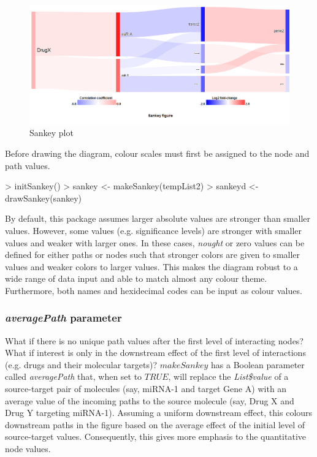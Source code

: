 \documentclass[a4paper]{article}
\begin{document}
\begin{figure}[htbp]
    \begin{center}
    \includegraphics[width=\textwidth]{figure1.png}
    \caption{Sankey plot}
    \end{center}
\end{figure}

Before drawing the diagram, colour scales  must first be assigned to the node and path values.
\begin{Schunk}
\begin{Sinput}
> initSankey()
> sankey <- makeSankey(tempList2)
> sankeyd <- drawSankey(sankey)
\end{Sinput}
\end{Schunk}

By default, this package assumes larger absolute values are stronger than smaller values. However, some values (e.g. significance levels)  are stronger with smaller values and weaker with larger ones. In these cases, \textit{nought} or zero values can be defined for either paths or nodes such that stronger colors are given to smaller values and weaker colors to larger values. This makes the diagram robust to a wide range of data input and able to match almost any colour theme. Furthermore, both names and hexidecimal codes can be input as colour values.

    \subsubsection{\textit{averagePath} parameter}
What if there is no unique path values after the first level of interacting nodes? What if interest is only in the downstream effect of the first level of interactions (e.g. drugs and their molecular targets)? $makeSankey$ has a Boolean parameter called \textit{averagePath} that, when set to $TRUE$, will replace the \textit{List\$value} of a source-target pair of molecules (say, miRNA-1 and target Gene A) with an average value of the incoming paths to the source molecule (say, Drug X and Drug Y targeting miRNA-1). Assuming a uniform downstream effect, this colours downstream paths in the figure based on the average effect of the initial level of source-target values. Consequently, this gives more emphasis to the quantitative node values.
\end{document}
